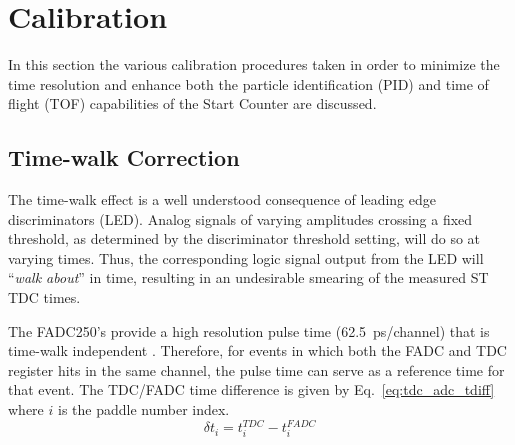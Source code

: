 \section{Calibration} \label{sec:calib}

In this section the various calibration procedures taken in order to minimize the time resolution and enhance both the particle identification (PID) and time of flight (TOF) capabilities of the Start Counter are discussed.

\subsection{Time-walk Correction} \label{sec:calib_tw}

The time-walk effect is a well understood consequence of leading edge discriminators (LED).  Analog signals of varying amplitudes crossing a fixed threshold, as determined by the discriminator threshold setting, will do so at varying times. %
Thus, the corresponding logic signal output from the LED will ``\textit{walk about}'' in time, resulting in an undesirable smearing of the measured ST TDC times.

The FADC250's provide a high resolution pulse time (62.5~ps/channel) that is time-walk independent \cite{pooser16} \cite{dong_fadc}.  
Therefore, for events in which both the FADC and TDC register hits in the same channel, the pulse time can serve as a reference time for that event.  The TDC/FADC time difference is given by Eq.~\ref{eq:tdc_adc_tdiff} where $i$ is the paddle number index.
	\begin{equation} \label{eq:tdc_adc_tdiff}
		\delta t_{i} = t^{TDC}_{i} - t^{FADC}_{i}
	\end{equation}
	

